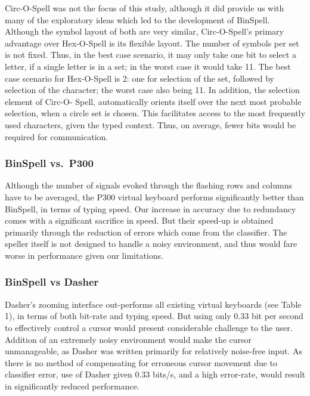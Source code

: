 \documentclass[12pt,titlepage]{article}
\begin{document}
Circ-O-Spell was not the focus of this study, although it did provide us with many of the exploratory ideas which led to the development of BinSpell.  Although the symbol layout of both are very similar, Circ-O-Spell's primary advantage over Hex-O-Spell is its flexible layout.  The number of 
symbols per set is not fixed.  Thus, in the best case scenario, it may only take one bit to select a 
letter, if a single letter is in a set; in the worst case it would take 11.  The best case scenario for Hex-O-Spell is 2: one for selection 
of the set, followed by selection of the character; the worst case also being 11.  In addition, the selection element of Circ-O- 
Spell, automatically orients itself over the next most probable selection, when a circle set is chosen.  This facilitates access to the most frequently used 
characters, given the typed context.  Thus, on average, fewer bits would be required for 
communication.

\subsubsection{BinSpell vs.\ P300}

Although the number of signals evoked through the flashing rows and columns have to be averaged, the P300 virtual keyboard performs significantly better than BinSpell, in terms of typing speed.  Our increase in accuracy due to redundancy comes with a significant sacrifice in speed.  But their speed-up is obtained primarily through the reduction of errors which come from the classifier.  The speller itself is not designed to handle a noisy environment, and thus would fare worse in performance given our limitations.

\subsubsection{BinSpell vs Dasher}

Dasher's zooming interface out-performs all existing virtual keyboards (see Table 1), in terms of both bit-rate and typing speed.  But using only 0.33 bit per second to effectively control a cursor would present considerable challenge to the user.  Addition of an extremely 
noisy environment would make the cursor unmanageable, as Dasher was written primarily for relatively noise-free input. As there is no method of compensating for erroneous cursor movement due to classifier error, use of Dasher given $0.33$ bits/s, and a high error-rate, would result in significantly reduced performance.
\end{document}
